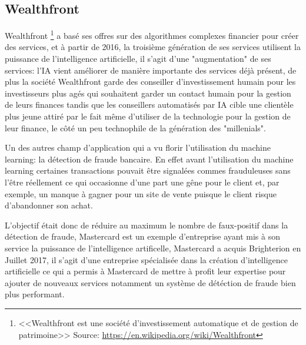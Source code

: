         \subsection*{Wealthfront}
            Wealthfront \footnote{<<Wealthfront est une société d'investissement automatique 
            et de gestion de patrimoine>> \newline Source: \url{https://en.wikipedia.org/wiki/Wealthfront} }
            a basé ses offres sur des algorithmes complexes financier pour créer des services,
            et à partir de 2016, la troisième génération de ses services utilisent la puissance 
            de l'intelligence artificielle, il s'agit d'une "augmentation" de ses services: 
            l'IA vient améliorer de manière importante des services déjà présent, de plus 
            la société Wealthfront garde des conseiller d'investissement humain 
            pour les investisseurs plus agés qui souhaitent garder un contact humain pour
            la gestion de leurs finances tandis que les conseillers automatisés par IA 
            cible une clientèle plus jeune attiré par le fait même d'utiliser de la technologie 
            pour la gestion de leur finance, le côté un peu technophile de la génération des "millenials". \newline

            Un des autres champ d'application qui a vu florir l'utilisation du machine learning: 
            la détection de fraude bancaire. En effet avant l'utilisation du machine learning 
            certaines transactions pouvait être signalées commes frauduleuses sans l'être réellement 
            ce qui occasionne d'une part une gêne pour le client et, par exemple, un manque à gagner pour 
            un site de vente puisque le client risque d'abandonner son achat. \newline

            L'objectif était donc de réduire au maximum le nombre de faux-positif dans 
            la détection de fraude, Mastercard est un exemple d'entreprise ayant mis 
            à son service la puissance de l'intelligence artificelle, Mastercard a
            acquis Brighterion en Juillet 2017, il s'agit d'une entreprise spécialisée 
            dans la création d'intelligence artificielle ce qui a permis à Mastercard de 
            mettre à profit leur expertise pour ajouter de nouveaux services 
            notamment un système de détéction de fraude bien plus performant. \newline

